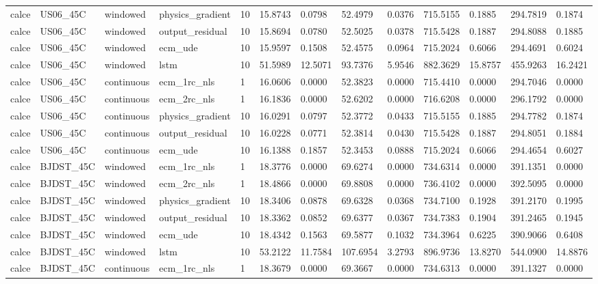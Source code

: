 \begin{tabular}{lllllllllllll}
calce & US06\_45C & windowed & physics\_gradient & 10 & 15.8743 & 0.0798 & 52.4979 & 0.0376 & 715.5155 & 0.1885 & 294.7819 & 0.1874 \\
calce & US06\_45C & windowed & output\_residual & 10 & 15.8694 & 0.0780 & 52.5025 & 0.0378 & 715.5428 & 0.1887 & 294.8088 & 0.1885 \\
calce & US06\_45C & windowed & ecm\_ude & 10 & 15.9597 & 0.1508 & 52.4575 & 0.0964 & 715.2024 & 0.6066 & 294.4691 & 0.6024 \\
calce & US06\_45C & windowed & lstm & 10 & 51.5989 & 12.5071 & 93.7376 & 5.9546 & 882.3629 & 15.8757 & 455.9263 & 16.2421 \\
calce & US06\_45C & continuous & ecm\_1rc\_nls & 1 & 16.0606 & 0.0000 & 52.3823 & 0.0000 & 715.4410 & 0.0000 & 294.7046 & 0.0000 \\
calce & US06\_45C & continuous & ecm\_2rc\_nls & 1 & 16.1836 & 0.0000 & 52.6202 & 0.0000 & 716.6208 & 0.0000 & 296.1792 & 0.0000 \\
calce & US06\_45C & continuous & physics\_gradient & 10 & 16.0291 & 0.0797 & 52.3772 & 0.0433 & 715.5155 & 0.1885 & 294.7782 & 0.1874 \\
calce & US06\_45C & continuous & output\_residual & 10 & 16.0228 & 0.0771 & 52.3814 & 0.0430 & 715.5428 & 0.1887 & 294.8051 & 0.1884 \\
calce & US06\_45C & continuous & ecm\_ude & 10 & 16.1388 & 0.1857 & 52.3453 & 0.0888 & 715.2024 & 0.6066 & 294.4654 & 0.6027 \\
calce & BJDST\_45C & windowed & ecm\_1rc\_nls & 1 & 18.3776 & 0.0000 & 69.6274 & 0.0000 & 734.6314 & 0.0000 & 391.1351 & 0.0000 \\
calce & BJDST\_45C & windowed & ecm\_2rc\_nls & 1 & 18.4866 & 0.0000 & 69.8808 & 0.0000 & 736.4102 & 0.0000 & 392.5095 & 0.0000 \\
calce & BJDST\_45C & windowed & physics\_gradient & 10 & 18.3406 & 0.0878 & 69.6328 & 0.0368 & 734.7100 & 0.1928 & 391.2170 & 0.1995 \\
calce & BJDST\_45C & windowed & output\_residual & 10 & 18.3362 & 0.0852 & 69.6377 & 0.0367 & 734.7383 & 0.1904 & 391.2465 & 0.1945 \\
calce & BJDST\_45C & windowed & ecm\_ude & 10 & 18.4342 & 0.1563 & 69.5877 & 0.1032 & 734.3964 & 0.6225 & 390.9066 & 0.6408 \\
calce & BJDST\_45C & windowed & lstm & 10 & 53.2122 & 11.7584 & 107.6954 & 3.2793 & 896.9736 & 13.8270 & 544.0900 & 14.8876 \\
calce & BJDST\_45C & continuous & ecm\_1rc\_nls & 1 & 18.3679 & 0.0000 & 69.3667 & 0.0000 & 734.6313 & 0.0000 & 391.1327 & 0.0000 \\

\end{tabular}
